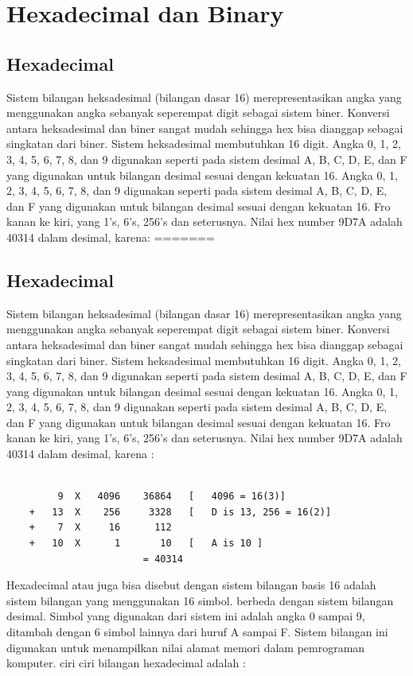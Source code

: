 
\section {Hexadecimal dan Binary}


\subsection {Hexadecimal}
Sistem bilangan heksadesimal (bilangan dasar 16) merepresentasikan angka yang menggunakan angka sebanyak seperempat digit sebagai sistem biner. Konversi antara heksadesimal dan biner sangat mudah sehingga hex bisa dianggap sebagai singkatan dari biner. Sistem heksadesimal membutuhkan 16 digit. Angka 0, 1, 2, 3, 4, 5, 6, 7, 8, dan 9 digunakan seperti pada sistem desimal A, B, C, D, E, dan F yang digunakan untuk bilangan desimal sesuai dengan kekuatan 16. Angka 0, 1, 2, 3, 4, 5, 6, 7, 8, dan 9 digunakan seperti pada sistem desimal A, B, C, D, E, dan F yang digunakan untuk bilangan desimal sesuai dengan kekuatan 16. Fro kanan ke kiri, yang 1's, 6's, 256's dan seterusnya. Nilai hex number 9D7A adalah 40314 dalam desimal, karena:
=======
	\subsection {Hexadecimal}
	Sistem bilangan heksadesimal (bilangan dasar 16) merepresentasikan angka yang menggunakan angka sebanyak seperempat digit sebagai sistem biner. Konversi antara heksadesimal dan biner sangat mudah sehingga hex bisa dianggap sebagai singkatan dari biner. Sistem heksadesimal membutuhkan 16 digit. Angka 0, 1, 2, 3, 4, 5, 6, 7, 8, dan 9 digunakan seperti pada sistem desimal A, B, C, D, E, dan F yang digunakan untuk bilangan desimal sesuai dengan kekuatan 16. Angka 0, 1, 2, 3, 4, 5, 6, 7, 8, dan 9 digunakan seperti pada sistem desimal A, B, C, D, E, dan F yang digunakan untuk bilangan desimal sesuai dengan kekuatan 16. Fro kanan ke kiri, yang 1's, 6's, 256's dan seterusnya. Nilai hex number 9D7A adalah 40314 dalam desimal, karena \cite{detmer2001introduction}:

	\begin{verbatim}

		 9	X	4096	36864	[	4096 = 16(3)]
	+	13	X	 256	 3328	[	D is 13, 256 = 16(2)]
	+	 7	X	  16	  112
	+	10	X	   1	   10	[	A is 10	]
						= 40314
	\end{verbatim}
Hexadecimal atau juga bisa disebut dengan sistem bilangan basis 16 adalah sistem bilangan yang menggunakan 16 simbol. berbeda dengan sistem bilangan desimal. Simbol yang digunakan dari sistem ini adalah angka 0 sampai 9, ditambah dengan 6 simbol lainnya dari huruf A sampai F. Sistem bilangan ini digunakan untuk menampilkan nilai alamat memori dalam pemrograman komputer\cite{hutahaean2015konsep}.
ciri ciri bilangan hexadecimal adalah :

